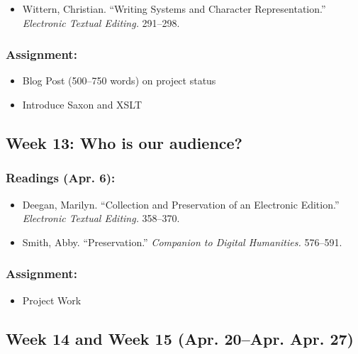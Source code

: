 \documentclass[]{article}
\begin{document}
\begin{itemize}
\itemsep1pt\parskip0pt
\item
  Wittern, Christian. ``Writing Systems and Character Representation.''
  \emph{Electronic Textual Editing.} 291--298.
\end{itemize}

\subsubsection{Assignment:}\label{assignment-3}

\begin{itemize}
\itemsep1pt\parskip0pt
\item
  Blog Post (500--750 words) on project status
\item
  Introduce Saxon and XSLT
\end{itemize}

\subsection{Week 13: Who is our
audience?}\label{week-13-who-is-our-audience}

\subsubsection{Readings (Apr. 6):}\label{readings-apr.-6}

\begin{itemize}
\itemsep1pt\parskip0pt
\item
  Deegan, Marilyn. ``Collection and Preservation of an Electronic
  Edition.'' \emph{Electronic Textual Editing.} 358--370.
\item
  Smith, Abby. ``Preservation.'' \emph{Companion to Digital Humanities.}
  576--591.
\end{itemize}

\subsubsection{Assignment:}\label{assignment-4}

\begin{itemize}
\itemsep1pt\parskip0pt
\item
  Project Work
\end{itemize}

\subsection{Week 14 and Week 15 (Apr. 20--Apr. Apr.
27)}\label{week-14-and-week-15-apr.-20apr.-apr.-27}
\end{document}
